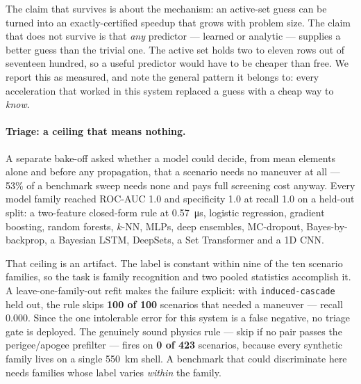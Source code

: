 The claim that survives is about the mechanism: an active-set guess can be
turned into an exactly-certified speedup that grows with problem size. The claim
that does not survive is that \emph{any} predictor --- learned or analytic ---
supplies a better guess than the trivial one. The active set holds two to eleven
rows out of seventeen hundred, so a useful predictor would have to be cheaper
than free. We report this as measured, and note the general pattern it belongs
to: every acceleration that worked in this system replaced a guess with a cheap
way to \emph{know}.

\paragraph{Triage: a ceiling that means nothing.} A separate bake-off asked
whether a model could decide, from mean elements alone and before any
propagation, that a scenario needs no maneuver at all --- 53\% of a benchmark
sweep needs none and pays full screening cost anyway. Every model family
reached ROC-AUC \num{1.0} and specificity \num{1.0} at recall \num{1.0} on a
held-out split: a two-feature closed-form rule at \SI{0.57}{\micro\second},
logistic regression, gradient boosting, random forests, $k$-NN, MLPs, deep
ensembles, MC-dropout, Bayes-by-backprop, a Bayesian LSTM, DeepSets, a Set
Transformer and a 1D CNN.

That ceiling is an artifact. The label is constant within nine of the ten
scenario families, so the task is family recognition and two pooled statistics
accomplish it. A leave-one-family-out refit makes the failure explicit: with
\texttt{induced-cascade} held out, the rule skips \textbf{100 of 100} scenarios
that needed a maneuver --- recall \num{0.000}. Since the one intolerable error
for this system is a false negative, no triage gate is deployed. The genuinely
sound physics rule --- skip if no pair passes the perigee/apogee prefilter ---
fires on \textbf{0 of 423} scenarios, because every synthetic family lives on a
single \SI{550}{\kilo\meter} shell. A benchmark that could discriminate here
needs families whose label varies \emph{within} the family.

